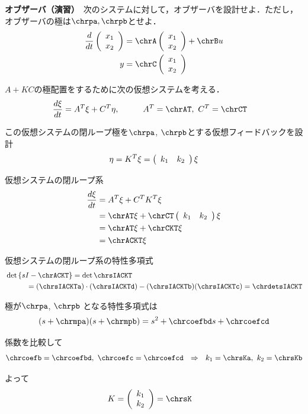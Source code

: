 \newpage
\noindent
{\bf オブザーバ（演習）}　次のシステムに対して，オブザーバを設計せよ．ただし，オブザーバの極は$\chrpa,\chrpb$とせよ．
\begin{align*}
	\frac{d}{dt}
	\state
	& = 
	\chrA \state
	+
	\chrB u
\\
	y&=
	\chrC \state
\end{align*}

$A+KC$の極配置をするために次の仮想システムを考える．
\begin{align*}
 \frac{d \xi}{dt} & = A^T \xi + C^T \eta, 
\hspace{1cm}
	A^T = \chrAT
	, \ 
	C^T = \chrCT
\end{align*}

この仮想システムの閉ループ極を$\chrpa$, $\chrpb$とする仮想フィードバックを設計
\begin{align*}
 \eta =  K^T \xi
	= \left ( \begin{array}{cc} k_1 & k_2 \end{array} \right ) \xi
\end{align*}

仮想システムの閉ループ系
\begin{align*}
 \frac{d \xi}{dt} & = A^T \xi + C^T K^T \xi
\\
	&= \chrAT \xi
	+
	\chrCT \cKT \xi
\\
	&= \chrAT \xi + \chrCKT \xi
\\
	&= \chrACKT \xi
\end{align*}

仮想システムの閉ループ系の特性多項式
\begin{align*}
	&\det
	\left \{
		sI- \chrACKT
	\right \}
	=
	\det \chrsIACKT
\\
	& \hspace{1cm} =
	(\chrsIACKTa) \cdot (\chrsIACKTd) -(\chrsIACKTb)(\chrsIACKTc)
	=
	\chrdetsIACKT
\end{align*}

極が$\chrpa$, $\chrpb$ となる特性多項式は
\begin{align*}
	(s+\chrmpa)(s+\chrmpb) = s^2 + \chrcoefbd s + \chrcoefcd
\end{align*}

係数を比較して
\begin{align*}
	\chrcoefb=\chrcoefbd, \ \chrcoefc=\chrcoefcd 
	\ \ \Rightarrow \ \ 
	k_1=\chrsKa, \ k_2=\chrsKb
\end{align*}

よって
\begin{align*}
	K&= \cK = \chrsK
\end{align*}

